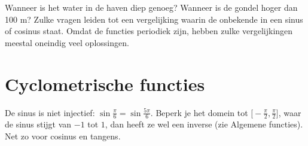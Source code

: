 %



Wanneer is het water in de haven diep genoeg? Wanneer is de gondel hoger dan 100 m? Zulke vragen leiden tot een vergelijking waarin de onbekende in een sinus of cosinus staat. Omdat de functies periodiek zijn, hebben zulke vergelijkingen meestal oneindig veel oplossingen.

\begin{oefeningen}[Start]

\end{oefeningen}

\section{Cyclometrische functies}

De sinus is niet injectief: $\sin\frac{\pi}{6} = \sin\frac{5\pi}{6}$. Beperk je het domein tot $\bigl[-\frac{\pi}{2}, \frac{\pi}{2}\bigr]$, waar de sinus stijgt van $-1$ tot $1$, dan heeft ze wel een inverse (zie Algemene functies). Net zo voor cosinus en tangens.

